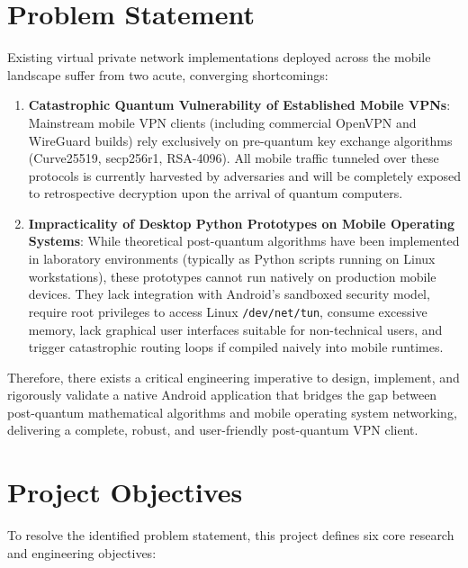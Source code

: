 \section{Problem Statement}
\label{sec:problem_statement}

Existing virtual private network implementations deployed across the mobile landscape suffer from two acute, converging shortcomings:

\begin{enumerate}[label=\textbf{PS\arabic*.}]
    \item \textbf{Catastrophic Quantum Vulnerability of Established Mobile VPNs}: Mainstream mobile VPN clients (including commercial OpenVPN and WireGuard builds) rely exclusively on pre-quantum key exchange algorithms (Curve25519, secp256r1, RSA-4096). All mobile traffic tunneled over these protocols is currently harvested by adversaries and will be completely exposed to retrospective decryption upon the arrival of quantum computers.
    \item \textbf{Impracticality of Desktop Python Prototypes on Mobile Operating Systems}: While theoretical post-quantum algorithms have been implemented in laboratory environments (typically as Python scripts running on Linux workstations), these prototypes cannot run natively on production mobile devices. They lack integration with Android's sandboxed security model, require root privileges to access Linux \texttt{/dev/net/tun}, consume excessive memory, lack graphical user interfaces suitable for non-technical users, and trigger catastrophic routing loops if compiled naively into mobile runtimes.
\end{enumerate}

Therefore, there exists a critical engineering imperative to design, implement, and rigorously validate a native Android application that bridges the gap between post-quantum mathematical algorithms and mobile operating system networking, delivering a complete, robust, and user-friendly post-quantum VPN client.

\section{Project Objectives}
\label{sec:project_objectives}

To resolve the identified problem statement, this project defines six core research and engineering objectives:

